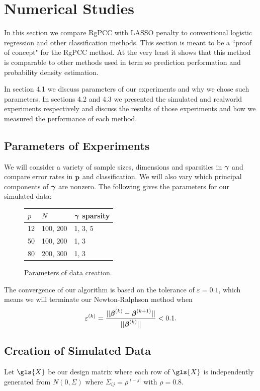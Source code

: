 \documentclass[main.tex]{subfiles}
\begin{document}
\section{Numerical Studies}
In this section we compare RgPCC with LASSO penalty to conventional logistic regression and other classification methods. This section is meant to be a ``proof of concept" for the RgPCC method. At the very least it shows that this method is comparable to other methods used in term so prediction performation and probability density estimation.

In section 4.1 we discuss parameters of our experiments and why we chose such parameters. In sections 4.2 and 4.3 we presented the simulated and realworld experiments respectively and discuss the results of those experiments and how we measured the performance of each method. 




\subsection{Parameters of Experiments}

We will consider a variety of sample sizes, dimensions and sparsities in $\boldsymbol \gamma$ and compare error rates in $\mathbf{p}$ and classification. We will also vary which principal components of $\boldsymbol \gamma$ are nonzero. The following gives the parameters for our simulated data:

\begin{figure}[H]
	\begin{tabular}{l l l} \hline
		$p$ & $N$ & $\boldsymbol \gamma$ sparsity \\ \hline
		\rowcolor{LightCyan}
		12 & 100, 200 & 1, 3, 5 \\
		50 & 100, 200 & 1, 3 \\
		\rowcolor{LightCyan}
		80 & 200, 300 & 1, 3 \\ \hline
	\end{tabular}
	\caption{Parameters of data creation.}
	\label{figure:params}
\end{figure}

The convergence of our algorithm is based on the tolerance of $\varepsilon = 0.1$, which means we will terminate our Newton-Ralphson method when $$\varepsilon^{(k)} = \frac{||\boldsymbol \beta^{(k)} - \boldsymbol \beta^{(k+1)}||}{||\boldsymbol \beta^{(k)}||} < 0.1.$$

\subsection{Creation of Simulated Data}
Let $\gls{X}$ be our design matrix where each row of $\gls{X}$ is independently generated from $N(0, \Sigma)$ where $\Sigma_{ij} = \rho^{|i - j|}$ with $\rho = 0.8$.
\end{document}
